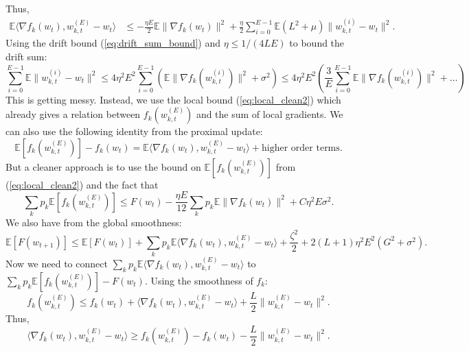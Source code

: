 \documentclass{article}
\begin{document}
Thus,
\begin{align}
    \mathbb{E} \langle \nabla f_k(w_t), w_{k,t}^{(E)} - w_t \rangle &\leq - \frac{\eta E}{2} \mathbb{E} \| \nabla f_k(w_t) \|^2 + \frac{\eta}{2} \sum_{i=0}^{E-1} \mathbb{E} \left( L^2 + \mu \right) \| w_{k,t}^{(i)} - w_t \|^2.
\end{align}
Using the drift bound (\ref{eq:drift_sum_bound}) and $\eta \leq 1/(4LE)$ to bound the drift sum:
\begin{equation}
    \sum_{i=0}^{E-1} \mathbb{E} \| w_{k,t}^{(i)} - w_t \|^2 \leq 4 \eta^2 E^2 \sum_{i=0}^{E-1} \left( \mathbb{E} \| \nabla f_k(w_{k,t}^{(i)}) \|^2 + \sigma^2 \right) \leq 4 \eta^2 E^2 \left( \frac{3}{E} \sum_{i=0}^{E-1} \mathbb{E} \| \nabla f_k(w_{k,t}^{(i)}) \|^2 + \dots \right)
\end{equation}
This is getting messy. Instead, we use the local bound (\ref{eq:local_clean2}) which already gives a relation between $f_k(w_{k,t}^{(E)})$ and the sum of local gradients. We can also use the following identity from the proximal update:
\begin{equation}
    \mathbb{E}[f_k(w_{k,t}^{(E)})] - f_k(w_t) = \mathbb{E} \langle \nabla f_k(w_t), w_{k,t}^{(E)} - w_t \rangle + \text{higher order terms}.
\end{equation}
But a cleaner approach is to use the bound on $\mathbb{E}[f_k(w_{k,t}^{(E)})]$ from (\ref{eq:local_clean2}) and the fact that
\begin{equation}
    \sum_k p_k \mathbb{E}[f_k(w_{k,t}^{(E)})] \leq F(w_t) - \frac{\eta E}{12} \sum_k p_k \mathbb{E} \| \nabla f_k(w_t) \|^2 + C \eta^2 E \sigma^2.
\end{equation}
We also have from the global smoothness:
\begin{equation}
    \mathbb{E}[F(w_{t+1})] \leq \mathbb{E}[F(w_t)] + \sum_k p_k \mathbb{E} \langle \nabla f_k(w_t), w_{k,t}^{(E)} - w_t \rangle + \frac{\zeta^2}{2} + 2(L+1) \eta^2 E^2 (G^2 + \sigma^2).
\end{equation}
Now we need to connect $\sum_k p_k \mathbb{E} \langle \nabla f_k(w_t), w_{k,t}^{(E)} - w_t \rangle$ to $\sum_k p_k \mathbb{E}[f_k(w_{k,t}^{(E)})] - F(w_t)$. Using the smoothness of $f_k$:
\begin{equation}
    f_k(w_{k,t}^{(E)}) \leq f_k(w_t) + \langle \nabla f_k(w_t), w_{k,t}^{(E)} - w_t \rangle + \frac{L}{2} \| w_{k,t}^{(E)} - w_t \|^2.
\end{equation}
Thus,
\begin{equation}
    \langle \nabla f_k(w_t), w_{k,t}^{(E)} - w_t \rangle \geq f_k(w_{k,t}^{(E)}) - f_k(w_t) - \frac{L}{2} \| w_{k,t}^{(E)} - w_t \|^2.
\end{equation}
\end{document}
